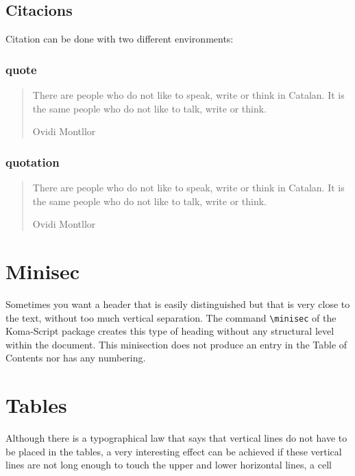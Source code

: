 \documentclass[a4paper,
                             twoside,
                             BCOR1.0cm,
                             DIV11,
                             parskip=full,
                             11pt]{scrbook}
\begin{document}
\subsection{Citacions}\label{sbsec:citations}
Citation can be done with two different environments:
\subsubsection{quote}\label{sbsec:quote}

\begin{quote}
There are people who do not like to speak, write or think in Catalan. It is the same people who do not like to talk, write or think.

Ovidi Montllor
\end{quote}

\subsubsection{quotation}\label{sbsec:quotation}
\begin{quotation}
There are people who do not like to speak, write or think in Catalan. It is the same people who do not like to talk, write or think.

Ovidi Montllor
\end{quotation}

\section{Minisec}\label{sec:minisec}
Sometimes you want a header that is easily distinguished but that is very close to the text, without too much vertical separation. The command \verb+\minisec+ of the Koma-Script package creates this type of heading without any structural level within the document. This minisection does not produce an entry in the Table of Contents nor has any numbering.

\lipsum[1-2]

\section{Tables}\label{sec:tables}

Although there is a typographical law that says that vertical lines do not have to be placed in the tables, a very interesting effect can be achieved if these vertical lines are not long enough to touch the upper and lower horizontal lines, a cell
\end{document}

